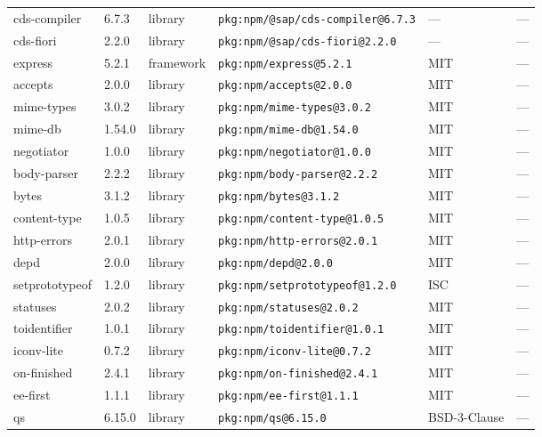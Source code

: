 \documentclass[11pt,a4paper]{article}
\begin{document}
\begin{longtable}{|p{4cm}|p{2cm}|p{1.6cm}|p{5cm}|p{1.5cm}|p{3.5cm}|}
\raggedright cds-compiler & 6.7.3 & library & \small\texttt{pkg:npm/@sap/cds-compiler@6.7.3} & — & \small — \\
\raggedright cds-fiori & 2.2.0 & library & \small\texttt{pkg:npm/@sap/cds-fiori@2.2.0} & — & \small — \\
\raggedright express & 5.2.1 & framework & \small\texttt{pkg:npm/express@5.2.1} & MIT & \small — \\
\raggedright accepts & 2.0.0 & library & \small\texttt{pkg:npm/accepts@2.0.0} & MIT & \small — \\
\raggedright mime-types & 3.0.2 & library & \small\texttt{pkg:npm/mime-types@3.0.2} & MIT & \small — \\
\raggedright mime-db & 1.54.0 & library & \small\texttt{pkg:npm/mime-db@1.54.0} & MIT & \small — \\
\raggedright negotiator & 1.0.0 & library & \small\texttt{pkg:npm/negotiator@1.0.0} & MIT & \small — \\
\raggedright body-parser & 2.2.2 & library & \small\texttt{pkg:npm/body-parser@2.2.2} & MIT & \small — \\
\raggedright bytes & 3.1.2 & library & \small\texttt{pkg:npm/bytes@3.1.2} & MIT & \small — \\
\raggedright content-type & 1.0.5 & library & \small\texttt{pkg:npm/content-type@1.0.5} & MIT & \small — \\
\raggedright http-errors & 2.0.1 & library & \small\texttt{pkg:npm/http-errors@2.0.1} & MIT & \small — \\
\raggedright depd & 2.0.0 & library & \small\texttt{pkg:npm/depd@2.0.0} & MIT & \small — \\
\raggedright setprototypeof & 1.2.0 & library & \small\texttt{pkg:npm/setprototypeof@1.2.0} & ISC & \small — \\
\raggedright statuses & 2.0.2 & library & \small\texttt{pkg:npm/statuses@2.0.2} & MIT & \small — \\
\raggedright toidentifier & 1.0.1 & library & \small\texttt{pkg:npm/toidentifier@1.0.1} & MIT & \small — \\
\raggedright iconv-lite & 0.7.2 & library & \small\texttt{pkg:npm/iconv-lite@0.7.2} & MIT & \small — \\
\raggedright on-finished & 2.4.1 & library & \small\texttt{pkg:npm/on-finished@2.4.1} & MIT & \small — \\
\raggedright ee-first & 1.1.1 & library & \small\texttt{pkg:npm/ee-first@1.1.1} & MIT & \small — \\
\raggedright qs & 6.15.0 & library & \small\texttt{pkg:npm/qs@6.15.0} & BSD-3-Clause & \small — \\

\end{longtable}
\end{document}
